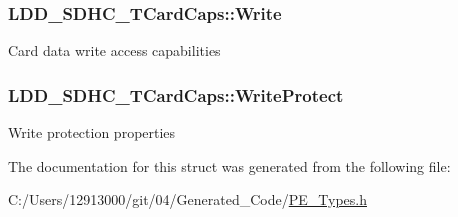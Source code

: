 \subsubsection[{Write}]{ L\+D\+D\+\_\+\+S\+D\+H\+C\+\_\+\+T\+Card\+Caps\+::\+Write}\label{struct_l_d_d___s_d_h_c___t_card_caps_ad28c378a6b9edfbd726a8019d5c8be79}
Card data write access capabilities \hypertarget{struct_l_d_d___s_d_h_c___t_card_caps_a32ecbbace3b435b1d70a57b09bf9662b}{}
\subsubsection[{Write\+Protect}]{ L\+D\+D\+\_\+\+S\+D\+H\+C\+\_\+\+T\+Card\+Caps\+::\+Write\+Protect}\label{struct_l_d_d___s_d_h_c___t_card_caps_a32ecbbace3b435b1d70a57b09bf9662b}
Write protection properties 

The documentation for this struct was generated from the following file\+:\begin{DoxyCompactItemize}
\item 
C\+:/\+Users/12913000/git/04/\+Generated\+\_\+\+Code/\hyperlink{_p_e___types_8h}{P\+E\+\_\+\+Types.\+h}\end{DoxyCompactItemize}
